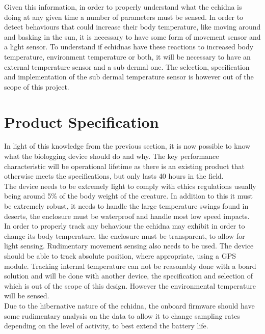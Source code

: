\documentclass[12pt,openany,a4paper]{book}
\begin{document}
	Given this information, in order to properly understand what the echidna is doing at any given time a number of parameters must be sensed. In order to detect behaviours that could increase their body temperature, like moving around and basking in the sun, it is necessary to have some form of movement sensor and a light sensor. To understand if echidnas have these reactions to increased body temperature, environment temperature or both, it will be necessary to have an external temperature sensor and a sub dermal one. The selection, specification and implementation of the sub dermal temperature sensor is however out of the scope of this project.
	
	\section{Product Specification} \label{sec:spec}
	In light of this knowledge from the previous section, it is now possible to know what the biologging device should do and why. The key performance characteristic will be operational lifetime as there is an existing product \cite{Freakley13} that otherwise meets the specifications, but only lasts 40 hours in the field. \\
	
	The device needs to be extremely light to comply with ethics regulations \cite{Mamm87} usually being around 5\% of the body weight of the creature. In addition to this it must be extremely robust, it needs to handle the large temperature swings found in deserts, the enclosure must be waterproof and handle most low speed impacts. \\
	
	In order to properly track any behaviour the echidna may exhibit in order to change its body temperature, the enclosure must be transparent, to allow for light sensing. Rudimentary movement sensing also needs to be used. The device should be able to track absolute position, where appropriate, using a GPS module. Tracking internal temperature can not be reasonably done with a board solution and will be done with another device, the specification and selection of which is out of the scope of this design. However the environmental temperature will be sensed. \\
	
	Due to the hibernative nature of the echidna, the onboard firmware should have some rudimentary analysis on the data to allow it to change sampling rates depending on the level of activity, to best extend the battery life. \\
	
\end{document}
